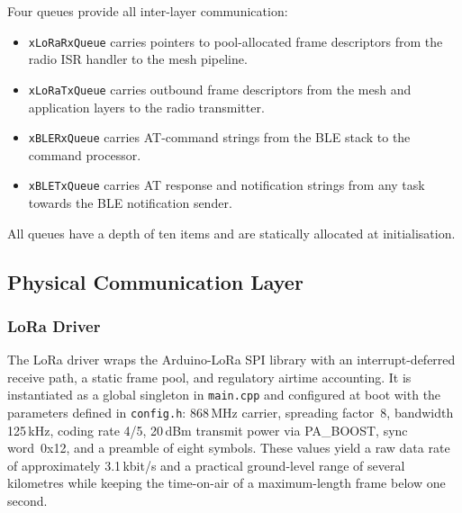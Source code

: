 \documentclass[english,bachelor]{tfgitic}[2026/01/22]
\begin{document}
Four queues provide all inter-layer communication:
\begin{itemize}
    \item \texttt{xLoRaRxQueue} carries pointers to pool-allocated frame descriptors from
    the radio ISR handler to the mesh pipeline.
    \item \texttt{xLoRaTxQueue} carries outbound frame descriptors from the mesh and
    application layers to the radio transmitter.
    \item \texttt{xBLERxQueue} carries AT-command strings from the BLE stack to the command
    processor.
    \item \texttt{xBLETxQueue} carries AT response and notification strings from any task
    towards the BLE notification sender.
\end{itemize}
All queues have a depth of ten items and are statically allocated at initialisation.




\subsection{Physical Communication Layer}
\label{sec:fw_physical}

\subsubsection{LoRa Driver}
\label{sec:fw_lora_driver}

The LoRa driver wraps the Arduino-LoRa SPI library with an interrupt-deferred
receive path, a static frame pool, and regulatory airtime accounting. It is
instantiated as a global singleton in \texttt{main.cpp} and configured at boot with
the parameters defined in \texttt{config.h}: 868\,MHz carrier, spreading factor~8,
bandwidth 125\,kHz, coding rate 4/5, 20\,dBm transmit power via PA\_BOOST, sync
word~0x12, and a preamble of eight symbols. These values yield a raw data rate of
approximately 3.1\,kbit/s and a practical ground-level range of several kilometres
while keeping the time-on-air of a maximum-length frame below one second.
\end{document}
